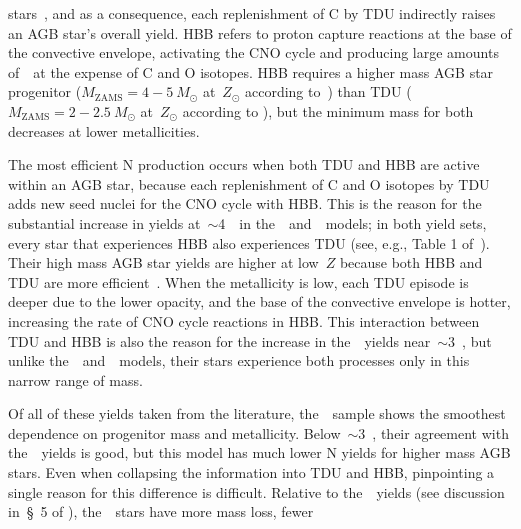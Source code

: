 \documentclass[ms.tex]{subfiles}
\begin{document}
stars~\citep{Gallino1998}, and as a consequence, each replenishment of C by TDU
indirectly raises an AGB star's overall yield.
HBB refers to proton capture reactions at the base of the convective envelope,
activating the CNO cycle and producing large amounts of~\Nfourteen~at the
expense of C and O isotopes.
HBB requires a higher mass AGB star progenitor ($M_\text{ZAMS} = 4 - 5~M_\odot$
at~$Z_\odot$ according to~\citealt{Karakas2010}) than TDU
($M_\text{ZAMS} = 2 - 2.5~M_\odot$ at~$Z_\odot$ according to
\citealt{Karakas2010}), but the minimum mass for both decreases at lower
metallicities.
\par
The most efficient N production occurs when both TDU and HBB are active within
an AGB star, because each replenishment of C and O isotopes by TDU adds new
seed nuclei for the CNO cycle with HBB.
This is the reason for the substantial increase in yields at~$\sim$4~\msun~in
the~\karakasten~and~\karakas~models; in both yield sets, every star that
experiences HBB also experiences TDU (see, e.g., Table 1
of~\citealp{Karakas2010}).
Their high mass AGB star yields are higher at low~$Z$ because both HBB and TDU
are more efficient~\citep[][see discussion in]{Ventura2013}.
When the metallicity is low, each TDU episode is deeper due to the lower
opacity, and the base of the convective envelope is hotter, increasing the rate
of CNO cycle reactions in HBB.
This interaction between TDU and HBB is also the reason for the increase in
the~\ventura~yields near~$\sim$3~\msun, but unlike
the~\karakasten~and~\karakas~models, their stars experience both processes only
in this narrow range of mass.
\par
Of all of these yields taken from the literature, the~\cristallo~sample shows
the smoothest dependence on progenitor mass and metallicity.
Below~$\sim$3~\msun, their agreement with the~\karakas~yields is good, but this
model has much lower N yields for higher mass AGB stars.
Even when collapsing the information into TDU and HBB, pinpointing a single
reason for this difference is difficult.
Relative to the~\karakas~yields (see discussion in~\S~5 of
\citealp{Karakas2016}), the~\cristallo~stars have more mass loss, fewer
\end{document}
